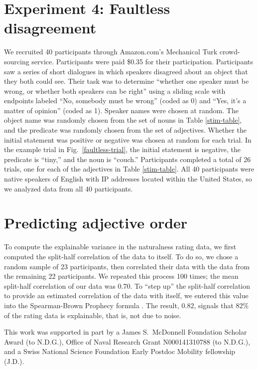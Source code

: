\documentclass{pnastwo}
\begin{document}
\begin{article}
\begin{materials}
\section{Experiment 4: Faultless disagreement}
We recruited 40 participants through Amazon.com's Mechanical Turk crowd-sourcing service. Participants were paid \$0.35 for their participation. Participants saw a series of short dialogues in which speakers disagreed about an object that they both could see.  Their task was to determine ``whether one speaker must be wrong, or whether both speakers can be right'' using a sliding scale with endpoints labeled ``No, somebody must be wrong'' (coded as 0)  and ``Yes, it's a matter of opinion'' (coded as 1). Speaker names were chosen at random. The object name was randomly chosen from the set of nouns in Table \ref{stim-table}, and the predicate was randomly chosen from the set of adjectives. Whether the initial statement was positive or negative was chosen at random for each trial. In the example trial in Fig.~\ref{faultless-trial}, the initial statement is negative, the predicate is ``tiny,'' and the noun is ``couch.'' Participants completed a total of 26 trials, one for each of the adjectives in Table \ref{stim-table}.
All 40 participants were native speakers of English with IP addresses located within the United States, so we analyzed data from all 40 participants.

\section{Predicting adjective order}
To compute the explainable variance in the naturalness rating data, we first computed the split-half correlation of the data to itself. To do so, we chose a random sample of 23 participants, then correlated their data with the data from the remaining 22 participants. We repeated this process 100 times; the mean split-half correlation of our data was 0.70. To ``step up'' the split-half correlation to provide an estimated correlation of the data with itself, we entered this value into the Spearman-Brown Prophecy formula \cite{stanley1971}. The result, 0.82, signals that 82\% of the rating data is explainable, that is, not due to noise.

\end{materials}


\begin{acknowledgments}
This work was supported in part by a James S.~McDonnell Foundation Scholar Award (to N.D.G.), Office of Naval Research Grant N000141310788 (to N.D.G.), and a Swiss National Science Foundation Early Postdoc Mobility fellowship (J.D.).
\end{acknowledgments}


\end{article}
\end{document}

